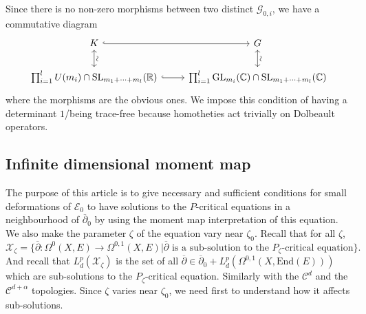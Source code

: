 \documentclass{article}
\theoremstyle{remark}
\theoremstyle{definition}
\newcommand{\R}{\mathbb{R}}
\newcommand{\C}{\mathbb{C}}
\newcommand{\End}{\mathrm{End}}
\newcommand{\GL}{\mathrm{GL}}
\newcommand{\E}{\mathcal{E}}
\newcommand{\G}{\mathcal{G}}
\newcommand{\mC}{\mathcal{C}}
\newcommand{\mX}{\mathcal{X}}
\newcommand{\dbar}{\overline{\partial}}
\begin{document}
Since there is no non-zero morphisms between two distinct $\G_{0,i}$, we have a commutative diagram
$$
\begin{tikzcd}
    K \ar[leftrightarrow,"\rotatebox{90}{$\sim$}"]{d}\ar[hookrightarrow]{r} & G \ar[leftrightarrow,"\rotatebox{90}{$\sim$}"]{d}\\
    \prod_{i = 1}^l U(m_i) \cap \mathrm{SL}_{m_1 + \cdots + m_l}(\R) \ar[hookrightarrow]{r} & \prod_{i = 1}^l \GL_{m_i}(\C) \cap \mathrm{SL}_{m_1 + \cdots + m_l}(\C)
\end{tikzcd}
$$
where the morphisms are the obvious ones. We impose this condition of having a determinant $1$/being trace-free because homotheties act trivially on Dolbeault operators.

\subsection{Infinite dimensional moment map}

The purpose of this article is to give necessary and sufficient conditions for small deformations of $\E_0$ to have solutions to the $P$-critical equations in a neighbourhood of $\dbar_0$ by using the moment map interpretation of this equation. We also make the parameter $\zeta$ of the equation vary near $\zeta_0$. Recall that for all $\zeta$,
$$
\mX_\zeta = \{\dbar : \Omega^0(X,E) \rightarrow \Omega^{0,1}(X,E)|\dbar \textrm{ is a sub-solution to the $P_\zeta$-critical equation}\}.
$$
And recall that $L_d^p(\mX_\zeta)$ is the set of all $\dbar \in \dbar_0 + L_d^p(\Omega^{0,1}(X,\End(E)))$ which are sub-solutions to the $P_\zeta$-critical equation. Similarly with the $\mC^d$ and the $\mC^{d + \alpha}$ topologies. Since $\zeta$ varies near $\zeta_0$, we need first to understand how it affects sub-solutions.
\end{document}
